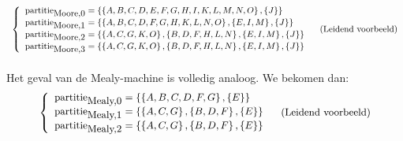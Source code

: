 \begin{equation}
\small{
\begin{array}{lr}
\left\{\begin{array}{l}
\mbox{partitie}_{\mbox{\small{Moore,0}}}=\ensuremath{\left\{ \left\{ A,B,C,D,E,F,G,H,I,K,L,M,N,O \right\},\left\{ J \right\} \right\}}\\
\mbox{partitie}_{\mbox{\small{Moore,1}}}=\ensuremath{\left\{ \left\{ A,B,C,D,F,G,H,K,L,N,O \right\},\left\{ E,I,M \right\},\left\{ J \right\} \right\}}\\
\mbox{partitie}_{\mbox{\small{Moore,2}}}=\ensuremath{\left\{ \left\{ A,C,G,K,O \right\},\left\{ B,D,F,H,L,N \right\},\left\{ E,I,M \right\},\left\{ J \right\} \right\}}\\
\mbox{partitie}_{\mbox{\small{Moore,3}}}=\ensuremath{\left\{ \left\{ A,C,G,K,O \right\},\left\{ B,D,F,H,L,N \right\},\left\{ E,I,M \right\},\left\{ J \right\} \right\}}
\end{array}\right.&\mbox{(Leidend voorbeeld)}
\end{array}}
\end{equation}

\paragraph{}
Het geval van de Mealy-machine is volledig analoog. We bekomen dan:
\begin{equation}
\small{
\begin{array}{lr}
\left\{\begin{array}{l}
\mbox{partitie}_{\mbox{\small{Mealy,0}}}=\ensuremath{\left\{ \left\{ A,B,C,D,F,G \right\},\left\{ E \right\} \right\}}\\
\mbox{partitie}_{\mbox{\small{Mealy,1}}}=\ensuremath{\left\{ \left\{ A,C,G \right\},\left\{ B,D,F \right\},\left\{ E \right\} \right\}}\\
\mbox{partitie}_{\mbox{\small{Mealy,2}}}=\ensuremath{\left\{ \left\{ A,C,G \right\},\left\{ B,D,F \right\},\left\{ E \right\} \right\}}
\end{array}\right.&\mbox{(Leidend voorbeeld)}
\end{array}}
\end{equation}

